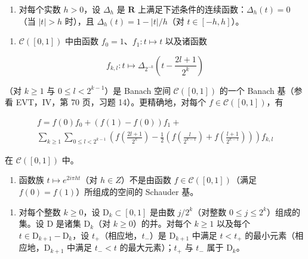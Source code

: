\begin{enumerate}
\def\labelenumi{\arabic{enumi})}
\setcounter{enumi}{44}
\tightlist
\item
  对每个实数 \(h > 0\)，设 \(\Delta_h\) 是 \(\mathbf{R}\) 上满足下述条件的连续函数：\(\Delta_h(t) = 0\)（当 \(|t| > h\) 时），且 \(\Delta_h(t) = 1 - |t| / h\)（对 \(t \in [-h, h]\)）。
\end{enumerate}

\begin{enumerate}
\def\labelenumi{\alph{enumi})}
\tightlist
\item
  \(\mathcal{C}([0,1])\) 中由函数 \(f_{0}=1\)、\(f_{1}:t\mapsto t\) 以及诸函数
\end{enumerate}

\[
f _ {k, l} \colon t \mapsto \Delta_ {2 ^ {- k}} \left(t - \frac {2 l + 1}{2 ^ {k}}\right)
\]

（对 \(k \geqslant 1\) 与 \(0 \leqslant l < 2^{k-1}\)）是 Banach 空间 \(\mathcal{C}([0,1])\) 的一个 Banach 基（参看 EVT，IV，第 70 页，习题 14）。更精确地，对每个 \(f \in \mathcal{C}([0,1])\)，有

\[
\begin{array}{l} f = f (0) f _ {0} + (f (1) - f (0)) f _ {1} + \\ \sum_ {k \geqslant 1} \sum_ {0 \leqslant l <   2 ^ {k - 1}} \left(f \left(\frac {2 l + 1}{2 ^ {k}}\right) - \frac {1}{2} \left(f \left(\frac {l}{2 ^ {k - 1}}\right) + f \left(\frac {l + 1}{2 ^ {k - 1}}\right)\right)\right) f _ {k, l} \end{array}
\]

在 \(\mathcal{C}([0,1])\) 中。

\begin{enumerate}
\def\labelenumi{\alph{enumi})}
\setcounter{enumi}{1}
\tightlist
\item
  函数族 \(t \mapsto e^{2i\pi ht}\)（对 \(h \in Z\)）不是由函数 \(f \in \mathcal{C}([0,1])\)（满足 \(f(0) = f(1)\)）所组成的空间的 Schauder 基。
\end{enumerate}

\begin{enumerate}
\def\labelenumi{\arabic{enumi})}
\setcounter{enumi}{45}
\tightlist
\item
  对每个整数 \(k \geqslant 0\)，设 \(\mathrm{D}_k \subset [0,1]\) 是由数 \(j/2^k\)（对整数 \(0 \leqslant j \leqslant 2^k\)）组成的集。设 D 是诸集 \(\mathrm{D}_k\)（对 \(k \geqslant 0\)）的并。对每个 \(k \geqslant 1\) 以及每个 \(t \in \mathrm{D}_{k+1} - \mathrm{D}_k\)，设 \(t_+\)（相应地，\(t_-\)）是 \(\mathrm{D}_{k+1}\) 中满足 \(t < t_+\) 的最小元素（相应地，\(\mathrm{D}_{k+1}\) 中满足 \(t_- < t\) 的最大元素）；\(t_+\) 与 \(t_-\) 属于 \(\mathrm{D}_k\)。
\end{enumerate}

